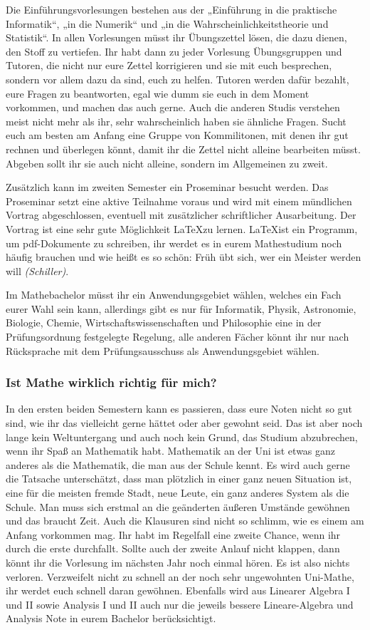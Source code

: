 Die Einführungsvorlesungen bestehen aus der „Einführung in die praktische Informatik“, „in die Numerik“ und „in die Wahrscheinlichkeitstheorie und Statistik“. In allen Vorlesungen müsst ihr Übungszettel lösen, die dazu dienen, den Stoff zu vertiefen. Ihr habt dann zu jeder Vorlesung Übungsgruppen und Tutoren, die nicht nur eure Zettel korrigieren und sie mit euch besprechen, sondern vor allem dazu da sind, euch zu helfen. Tutoren werden dafür bezahlt, eure Fragen zu beantworten, egal wie dumm sie euch in dem Moment vorkommen, und machen das auch gerne. Auch die anderen Studis verstehen meist nicht mehr als ihr, sehr wahrscheinlich haben sie ähnliche Fragen. Sucht euch am besten am Anfang eine Gruppe von Kommilitonen, mit denen ihr gut rechnen und überlegen könnt, damit ihr die Zettel nicht alleine bearbeiten müsst. Abgeben sollt ihr sie auch nicht alleine, sondern im Allgemeinen zu zweit.

Zusätzlich kann im zweiten Semester ein Proseminar besucht werden. Das Proseminar setzt eine aktive Teilnahme voraus und wird mit einem mündlichen Vortrag abgeschlossen, eventuell mit zusätzlicher schriftlicher Ausarbeitung. Der Vortrag ist eine sehr gute Möglichkeit \LaTeX zu lernen. \LaTeX ist ein Programm, um pdf-Dokumente zu schreiben, ihr werdet es in eurem Mathestudium noch häufig brauchen und wie heißt es so schön: Früh übt sich, wer ein Meister werden will \textit{(Schiller)}.

Im Mathebachelor müsst ihr ein Anwendungsgebiet wählen, welches ein Fach eurer Wahl sein kann, allerdings gibt es nur für Informatik, Physik, Astronomie, Biologie, Chemie, Wirtschaftswissenschaften und Philosophie eine in der Prüfungsordnung festgelegte Regelung, alle anderen Fächer könnt ihr nur nach Rücksprache mit dem Prüfungsausschuss als Anwendungsgebiet wählen.

\subsubsection{Ist Mathe wirklich richtig für mich?}

In den ersten beiden Semestern kann es passieren, dass eure Noten nicht so gut sind, wie ihr das vielleicht gerne hättet oder aber gewohnt seid. Das ist aber noch lange kein Weltuntergang und auch noch kein Grund, das Studium abzubrechen, wenn ihr Spaß an Mathematik habt. Mathematik an der Uni ist etwas ganz anderes als die Mathematik, die man aus der Schule kennt. Es wird auch gerne die Tatsache unterschätzt, dass man plötzlich in einer ganz neuen Situation ist, eine für die meisten fremde Stadt, neue Leute, ein ganz anderes System als die Schule. Man muss sich erstmal an die geänderten äußeren Umstände gewöhnen und das braucht Zeit. Auch die Klausuren sind nicht so schlimm, wie es einem am Anfang vorkommen mag. Ihr habt im Regelfall eine zweite Chance, wenn ihr durch die erste durchfallt. Sollte auch der zweite Anlauf nicht klappen, dann könnt ihr die Vorlesung im nächsten Jahr noch einmal hören. Es ist also nichts verloren. Verzweifelt nicht zu schnell an der noch sehr ungewohnten Uni-Mathe, ihr werdet euch schnell daran gewöhnen. Ebenfalls wird aus Linearer Algebra I und II sowie Analysis I und II auch nur die jeweils bessere Lineare-Algebra und Analysis Note in eurem Bachelor berücksichtigt.

